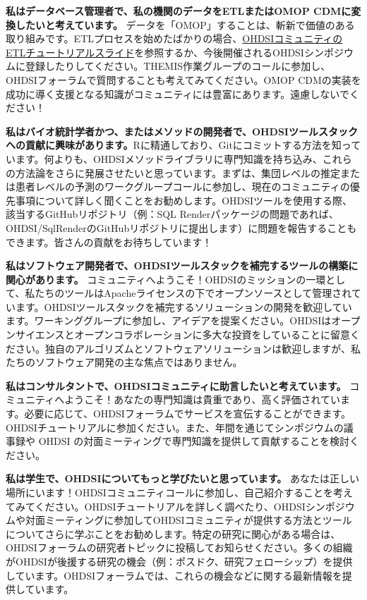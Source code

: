\documentclass[
  11pt]{book}
\theoremstyle{definition}
\theoremstyle{definition}
\theoremstyle{definition}
\theoremstyle{definition}
\theoremstyle{remark}
\begin{document}
\textbf{私はデータベース管理者で、私の機関のデータをETLまたはOMOP CDMに変換したいと考えています。} データを「OMOP」することは、斬新で価値のある取り組みです。ETLプロセスを始めたばかりの場合、\href{https://www.ohdsi-europe.org/images/symposium-2019/tutorials/OHDSI_Vocabulary_CDM_Tutorial.pdf}{OHDSIコミュニティのETLチュートリアルスライド}を参照するか、今後開催されるOHDSIシンポジウムに登録したりしてください。THEMIS作業グループのコールに参加し、OHDSIフォーラムで質問することも考えてみてください。OMOP CDMの実装を成功に導く支援となる知識がコミュニティには豊富にあります。遠慮しないでください！

\textbf{私はバイオ統計学者かつ、またはメソッドの開発者で、OHDSIツールスタックへの貢献に興味があります。}Rに精通しており、Gitにコミットする方法を知っています。何よりも、OHDSIメソッドライブラリに専門知識を持ち込み、これらの方法論をさらに発展させたいと思っています。まずは、集団レベルの推定または患者レベルの予測のワークグループコールに参加し、現在のコミュニティの優先事項について詳しく聞くことをお勧めします。OHDSIツールを使用する際、該当するGitHubリポジトリ（例：SQL Renderパッケージの問題であれば、OHDSI/SqlRenderのGitHubリポジトリに提出します）に問題を報告することもできます。皆さんの貢献をお待ちしています！

\textbf{私はソフトウェア開発者で、OHDSIツールスタックを補完するツールの構築に関心があります。} コミュニティへようこそ！OHDSIのミッションの一環として、私たちのツールはApacheライセンスの下でオープンソースとして管理されています。OHDSIツールスタックを補完するソリューションの開発を歓迎しています。ワーキンググループに参加し、アイデアを提案ください。OHDSIはオープンサイエンスとオープンコラボレーションに多大な投資をしていることに留意ください。独自のアルゴリズムとソフトウェアソリューションは歓迎しますが、私たちのソフトウェア開発の主な焦点ではありません。

\textbf{私はコンサルタントで、OHDSIコミュニティに助言したいと考えています。} コミュニティへようこそ！あなたの専門知識は貴重であり、高く評価されています。必要に応じて、OHDSIフォーラムでサービスを宣伝することができます。OHDSIチュートリアルに参加ください。また、年間を通じてシンポジウムの議事録や OHDSI の対面ミーティングで専門知識を提供して貢献することを検討ください。

\textbf{私は学生で、OHDSIについてもっと学びたいと思っています。} あなたは正しい場所にいます！OHDSIコミュニティコールに参加し、自己紹介することを考えてみてください。OHDSIチュートリアルを詳しく調べたり、OHDSIシンポジウムや対面ミーティングに参加してOHDSIコミュニティが提供する方法とツールについてさらに学ぶことをお勧めします。特定の研究に関心がある場合は、OHDSIフォーラムの研究者トピックに投稿してお知らせください。多くの組織がOHDSIが後援する研究の機会（例：ポスドク、研究フェローシップ）を提供しています。OHDSIフォーラムでは、これらの機会などに関する最新情報を提供しています。
\end{document}
